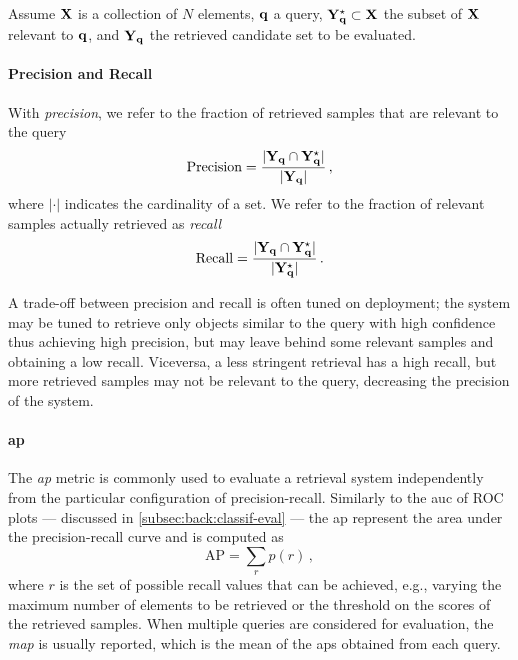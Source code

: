 Assume $\mathbf{X}$ %
is a collection of $N$ elements, $\mathbf{q}$ a query, $\mathbf{Y}^{\star}_{\mathbf{q}} \subset \mathbf{X}$ the subset of $\mathbf{X}$ relevant to $\mathbf{q}$, and $\mathbf{Y}_{\mathbf{q}}$ the retrieved candidate set to be evaluated.
\paragraph{Precision and Recall}
With \emph{precision}, we refer to the fraction of retrieved samples that are relevant to the query
\begin{equation} \label{eq:back:precision}
\text{Precision} = \frac{|\mathbf{Y}_{\mathbf{q}} \cap \mathbf{Y}^{\star}_{\mathbf{q}}|}{|\mathbf{Y}_{\mathbf{q}}|} \,,
\end{equation}
where $|\cdot|$ indicates the cardinality of a set.
We refer to the fraction of relevant samples actually retrieved as \emph{recall}
\begin{equation} \label{eq:back:recall}
\text{Recall} = \frac{|\mathbf{Y}_{\mathbf{q}} \cap \mathbf{Y}^{\star}_{\mathbf{q}}|}{|\mathbf{Y}^{\star}_{\mathbf{q}}|} \,.
\end{equation}

A trade-off between precision and recall is often tuned on deployment;
the system may be tuned to retrieve only objects similar to the query with high confidence thus achieving high precision, but may leave behind some relevant samples and obtaining a low recall.
Viceversa, a less stringent retrieval has a high recall, but more retrieved samples may not be relevant to the query, decreasing the precision of the system.

\paragraph{\acrlong{ap}}
The \emph{\acrfull{ap}} metric is commonly used to evaluate a retrieval system independently from the particular configuration of precision-recall.
Similarly to the \acrfull{auc} of ROC plots --- discussed in \ref{subsec:back:classif-eval} --- the \gls{ap} represent the area under the precision-recall curve and is computed as
\begin{equation} \label{eq:back:ap}
    \text{AP} = \sum_r p(r)\,,
\end{equation}
where $r$ is the set of possible recall values that can be achieved, e.g., varying the maximum number of elements to be retrieved or the threshold on the scores of the retrieved samples.
When multiple queries are considered for evaluation, the \emph{\acrfull{map}} is usually reported, which is the mean of the \glspl{ap} obtained from each query.

